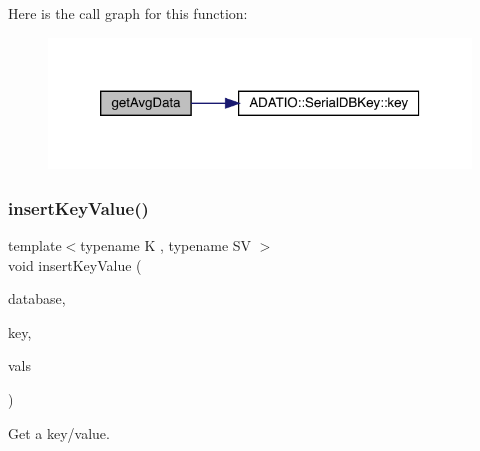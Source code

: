 Here is the call graph for this function\+:
\nopagebreak
\begin{figure}[H]
\begin{center}
\leavevmode
\includegraphics[width=320pt]{d2/d95/adat-devel_2main_2dbutil_2dbavgsrc_8cc_ae56af043dd66c496a9f847b9b5a6d604_cgraph}
\end{center}
\end{figure}
\mbox{\label{adat-devel_2main_2dbutil_2dbavgsrc_8cc_a8dcef9d29a9dfc5045f4ee378e94fca3}} 
\subsubsection{\texorpdfstring{insertKeyValue()}{insertKeyValue()}}
{\footnotesize\ttfamily template$<$typename K , typename SV $>$ \\
void insert\+Key\+Value (\begin{DoxyParamCaption}\item[{\mbox{\hyperlink{classFILEDB_1_1AllConfStoreDB}{All\+Conf\+Store\+DB}}$<$ \mbox{\hyperlink{classADATIO_1_1SerialDBKey}{Serial\+D\+B\+Key}}$<$ K $>$, \mbox{\hyperlink{classADATIO_1_1SerialDBData}{Serial\+D\+B\+Data}}$<$ SV $>$ $>$ \&}]{database,  }\item[{\mbox{\hyperlink{classADATIO_1_1SerialDBKey}{Serial\+D\+B\+Key}}$<$ K $>$ \&}]{key,  }\item[{std\+::vector$<$ \mbox{\hyperlink{classADATIO_1_1SerialDBData}{Serial\+D\+B\+Data}}$<$ SV $>$ $>$ \&}]{vals }\end{DoxyParamCaption})}



Get a key/value. 

